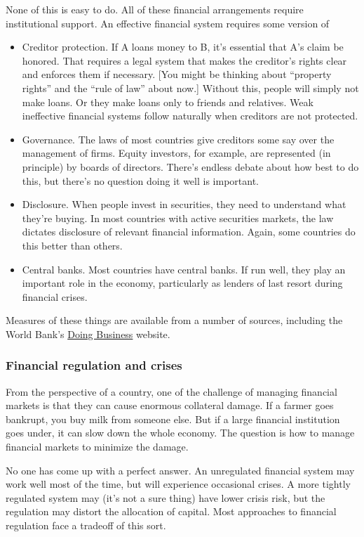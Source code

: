 \documentclass[letterpaper,12pt]{article}
\begin{document}
None of this is easy to do.  
All of these financial arrangements 
require institutional support.
An effective financial system requires some version of
%
\begin{itemize}
\item Creditor protection.
If A loans money to B, it's essential that A's claim be honored.
That requires a legal system that makes
the creditor's rights clear and enforces them if necessary.
[You might be thinking about ``property rights'' and the ``rule of law''
about now.]
Without this, people will simply not make loans.
Or they make loans only to friends and relatives.
Weak ineffective financial systems follow naturally
when creditors are not protected.

\item Governance.
The laws of most countries give creditors some
say over the management of firms.
Equity investors, for example,
are represented (in principle) by boards of directors.
There's endless debate about how best to do this,
but there's no question doing it well is important.

\item Disclosure.
When people invest in securities, they need to understand what
they're buying.
In most countries with active securities markets,
the law dictates disclosure of relevant financial information.
Again, some countries do this better than others.

\item Central banks.  
Most countries have central banks.  
If run well, they play an important role in the economy, 
particularly as lenders of last resort during financial crises.  
\end{itemize}
%
Measures of these things are available from a number
of sources,
including the World Bank's 
\href{http://www.doingbusiness.org/}{Doing Business}
website.  


\subsubsection*{Financial regulation and crises}

From the perspective of a country, one of 
the challenge of managing financial markets is that they 
can cause enormous collateral damage.  
If a farmer goes bankrupt, you buy milk from someone else.
But if a large financial institution goes under, 
it can slow down the whole economy.  
The question is how to manage financial markets to minimize the damage.  

No one has come up with a perfect answer.
An unregulated financial system may work well most of the time, 
but will experience occasional crises.  
A more tightly regulated system may (it's not a sure thing)
have lower crisis risk, but the regulation may distort
the allocation of capital.  
Most approaches to financial regulation face a tradeoff of this sort.  
\end{document}
